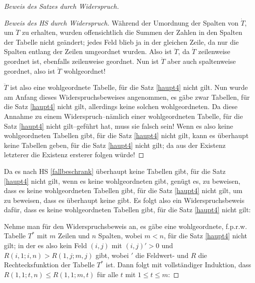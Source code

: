 \begin{proof}[Beweis des Satzes durch Widerspruch]
\begin{proof}[Beweis des HS durch Widerspruch]
        Während der Umordnung der Spalten von $\dot T$, um $\ddot T$ zu erhalten, wurden offensichtlich die Summen der 
        Zahlen in den Spalten der Tabelle nicht geändert; jedes Feld blieb ja in der gleichen Zeile, da nur die 
        Spalten entlang der Zeilen umgeordnet wurden. Also ist $\ddot T$, da $\dot T$ zeilenweise geordnet ist, 
        ebenfalls zeilenweise geordnet. Nun ist $\ddot T$ aber auch spaltenweise geordnet, also ist $\ddot T$ 
        wohlgeordnet!

        $\ddot T$ ist also eine wohlgeordnete Tabelle, für die Satz \ref{haupt4} nicht gilt. Nun wurde am Anfang dieses 
        Widerspruchsbeweises angenommen, es gäbe zwar Tabellen, für die Satz \ref{haupt4} nicht gilt, allerdings keine 
        solchen wohlgeordneten. Da diese Annahme zu einem Widerspruch--nämlich einer wohlgeordneten Tabelle, für die 
        Satz \ref{haupt4} nicht gilt--geführt hat, muss sie falsch sein! Wenn es also keine wohlgeordneten Tabellen 
        gibt, für die Satz \ref{haupt4} nicht gilt, kann es überhaupt keine Tabellen geben, für die Satz \ref{haupt4} 
        nicht gilt; da aus der Existenz letzterer die Existenz ersterer folgen würde!
    \end{proof}
    Da es nach HS \ref{fallbeschrank} überhaupt keine Tabellen gibt, für die Satz \ref{haupt4} 
    nicht gilt, wenn es keine wohlgeordneten gibt, genügt es, zu beweisen, dass es keine wohlgeordneten Tabellen 
    gibt, für die Satz \ref{haupt4} nicht gilt, um zu beweisen, dass es überhaupt keine gibt. Es folgt also ein 
    Widerspruchsbeweis dafür, dass es keine wohlgeordneten Tabellen gibt, für die Satz \ref{haupt4} nicht gilt:

    Nehme man für den Widerspruchsbeweis an, es gäbe eine wohlgeordnete, f.p.r.w. Tabelle $T^*$ mit $m$ Zeilen und $n$ 
    Spalten, wobei $m<n$, für die Satz \ref{haupt4} nicht gilt; in der es also kein Feld $(i, j)$ mit $(i, j)'>0$ 
    und $R(i, 1; i, n)>R(1, j; m, j)$ gibt, wobei $'$ die Feldwert- und $R$ die Rechtecksfunktion der Tabelle $T^*$ 
    ist. Dann folgt mit vollständiger Induktion, dass $R(1, 1; t, n)\leq R(1, 1; m, t)$ für alle $t$ mit $1\leq 
    t\leq m$:


\end{proof}
